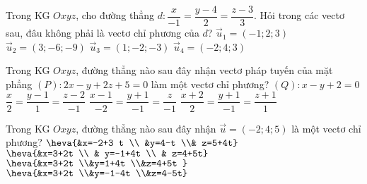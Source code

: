 \begin{ex}%
	Trong KG $Oxyz$, cho đường thẳng $d:\dfrac{x}{-1}=\dfrac{y-4}{2}=\dfrac{z-3}{3}$. Hỏi trong các vectơ sau, đâu không phải là vectơ chỉ phương của $d$?
	\choice
		{$\overrightarrow{u}_1=\left(-1;2;3\right)$}
		{$\overrightarrow{u}_2=\left(3;-6;-9\right)$}
		{$\overrightarrow{u}_3=\left(1;-2;-3\right)$}
		{\True $\overrightarrow{u}_4=\left(-2;4;3\right)$}
\end{ex}
\begin{ex}%
	Trong KG $Oxyz$, đường thẳng nào sau đây nhận vectơ pháp tuyến của mặt phẳng $(P) \colon 2x-y+2z+5=0$ làm một vectơ chỉ phương?
	\choice
	{$( Q) \colon x-y+2=0$}
	{$\dfrac{x}{2}=\dfrac{y-1}{1}=\dfrac{z-2}{-1}$}
	{\True $\dfrac{x-1}{-2}=\dfrac{y+1}{-1}=\dfrac{z}{-1}$}
	{$\dfrac{x+2}{2}=\dfrac{y+1}{-1}=\dfrac{z+1}{1}$}
\end{ex}
\begin{ex}%
	Trong KG $Oxyz$, đường thẳng nào sau đây nhận ${\overrightarrow{u}=(-2 ; 4 ; 5)}$ là một vectơ chỉ phương?
	\choice
	{$\heva{&x=-2+3 t \\ &y=4-t \\& z=5+4t}$}
	{$\heva{&x=3+2t \\ & y=-1+4t \\ & z=4+5t}$}
	{$\heva{&x=3+2t  \\&y=1+4t  \\&z=4+5t }$}
	{\True $\heva{&x=3+2t  \\&y=-1-4t  \\&z=4-5t}$}
\end{ex}
